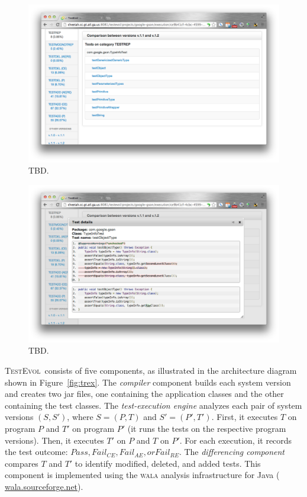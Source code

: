 \documentclass[conference]{IEEEtran}
\newcommand{\mt}{\mathit}
\newcommand{\pass}{\mt{Pass}}
\newcommand{\failce}{\mt{Fail}_{CE}}
\newcommand{\failre}{\mt{Fail}_{RE}}
\newcommand{\failae}{\mt{Fail}_{AE}}
\newcommand{\tool}{\textsc{TestEvol}\xspace}
\begin{document}
\begin{figure}[t]
	\centering
	\includegraphics[width=\columnwidth]{2-versiondetails}
        \vspace*{-16pt}
	\caption{TBD.}
        \vspace*{-8pt}
	\label{fig:versiondetails}
\end{figure}

\begin{figure}[t]
	\centering
	\includegraphics[width=\columnwidth]{3-testdetails}
        \vspace*{-16pt}
	\caption{TBD.}
        \vspace*{-8pt}
	\label{fig:testdetails}
\end{figure}

\tool\ consists of five components, as illustrated in the architecture
diagram shown in Figure~\ref{fig:trex}. 
%
The \emph{compiler} component builds each system version and creates
two jar files, one containing the application classes and the other
containing the test classes.
%
The \emph{test-execution engine} analyzes each pair of system versions
$(S, S')$, where $S = (P, T)$ and $S' = (P', T')$.  First, it executes
$T$ on program $P$ and $T'$ on program $P'$ (\ie it runs the tests on
the respective program versions).  Then, it executes $T'$ on $P$ and
$T$ on $P'$. For each execution, it records the test outcome: $\pass,
\failce, \failae, or \failre$.
%
The \emph{differencing component} compares $T$ and $T'$ to identify
modified, deleted, and added tests. This component is implemented
using the \textsc{wala} analysis infrastructure for Java ({\small
  \url{wala.sourceforge.net}}).
\end{document}
